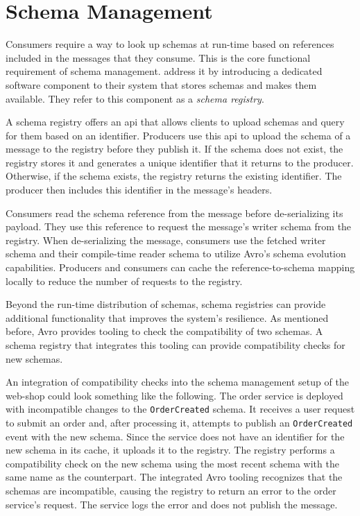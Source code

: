 
\section{Schema Management}\label{sec:schema-management}

Consumers require a way to look up schemas at run-time based on references included in the messages that they consume.
This is the core functional requirement of schema management.
\cite{kreps_kafka_2011} address it by introducing a dedicated software component to their system that stores schemas and makes them available.
They refer to this component as a \emph{schema registry}.

A schema registry offers an \gls{api} that allows clients to upload schemas and query for them based on an identifier.
Producers use this \gls{api} to upload the schema of a message to the registry before they publish it.
If the schema does not exist, the registry stores it and generates a unique identifier that it returns to the producer.
Otherwise, if the schema exists, the registry returns the existing identifier.
The producer then includes this identifier in the message's headers.

Consumers read the schema reference from the message before de-serializing its payload.
They use this reference to request the message's writer schema from the registry.
When de-serializing the message, consumers use the fetched writer schema and their compile-time reader schema to utilize Avro's schema evolution capabilities.
Producers and consumers can cache the reference-to-schema mapping locally to reduce the number of requests to the registry.

Beyond the run-time distribution of schemas, schema registries can provide additional functionality that improves the system's resilience.
As mentioned before, Avro provides tooling to check the compatibility of two schemas.
A schema registry that integrates this tooling can provide compatibility checks for new schemas.

An integration of compatibility checks into the schema management setup of the web-shop could look something like the following.
The order service is deployed with incompatible changes to the \texttt{OrderCreated} schema.
It receives a user request to submit an order and, after processing it, attempts to publish an \texttt{OrderCreated} event with the new schema.
Since the service does not have an identifier for the new schema in its cache, it uploads it to the registry.
The registry performs a compatibility check on the new schema using the most recent schema with the same name as the counterpart.
The integrated Avro tooling recognizes that the schemas are incompatible, causing the registry to return an error to the order service's request.
The service logs the error and does not publish the message.

